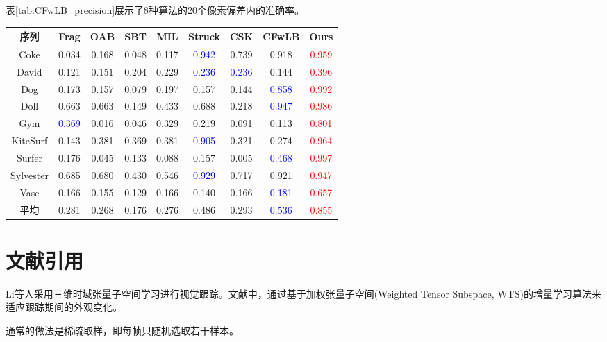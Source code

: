 表\ref{tab:CFwLB_precision}展示了8种算法的20个像素偏差内的准确率。
~\\
\begin{table*}[htbp]
\centering
\renewcommand{\arraystretch}{1.5}
\caption{8种算法20个像素偏差内的准确率}
    \begin{tabular}{|c|c|c|c|c|c|c|c|c|}
        \hline
        序列  & Frag  &  OAB  &  SBT  &  MIL  & Struck & CSK   & CFwLB   &  Ours \\ \hline

        Coke      & 0.034 & 0.168 & 0.048  & 0.117 & \textcolor{blue}{0.942} & 0.739 & 0.918   & \textcolor{red}{0.959}  \\ \hline
        David     & 0.121 & 0.151 & 0.204  & 0.229 & \textcolor{blue}{0.236} & \textcolor{blue}{0.236} & 0.144   & \textcolor{red}{0.396} \\ \hline
        Dog       & 0.173 & 0.157 & 0.079  & 0.197 & 0.157 & 0.144 & \textcolor{blue}{0.858}   & \textcolor{red}{0.992}  \\ \hline
        Doll      & 0.663 & 0.663 & 0.149  & 0.433 & 0.688 & 0.218 & \textcolor{blue}{0.947}& \textcolor{red}{ 0.986} \\ \hline
        Gym       & \textcolor{blue}{0.369} & 0.016 & 0.046  & 0.329 & 0.219 & 0.091 & 0.113   & \textcolor{red}{0.801}  \\ \hline
        KiteSurf  & 0.143 & 0.381 & 0.369  & 0.381 & \textcolor{blue}{0.905} & 0.321 & 0.274   & \textcolor{red}{0.964}  \\ \hline
        Surfer    & 0.176 & 0.045 & 0.133  & 0.088 & 0.157 & 0.005  & \textcolor{blue}{0.468}   & \textcolor{red}{0.997}  \\ \hline
    Sylvester     & 0.685 & 0.680 & 0.430  & 0.546 & \textcolor{blue}{0.929} & 0.717 & 0.921 & \textcolor{red}{0.947}\\ \hline
        Vase      & 0.166 & 0.155 & 0.129  & 0.166 & 0.140 & 0.166  & \textcolor{blue}{0.181}   & \textcolor{red}{0.657}  \\ \hline \hline

        平均      &0.281  & 0.268 & 0.176  & 0.276 & 0.486 & 0.293  & \textcolor{blue}{0.536}& \textcolor{red}{0.855} \\ \hline
\end{tabular}
\label{tab:CFwLB_precision}
\end{table*}
\setlength{\baselineskip}{20pt}


\section{文献引用}

Li等\cite{xiao2001}人采用三维时域张量子空间学习进行视觉跟踪。文献\cite{xiao2001}中，通过基于加权张量子空间(Weighted Tensor Subspace, WTS)的增量学习算法来适应跟踪期间的外观变化。

通常的做法是稀疏取样，即每帧只随机选取若干样本\cite{Zhang2012Real,kalal2012tracking,babenko2011robust,saffari2009line,hare2016struck}。

